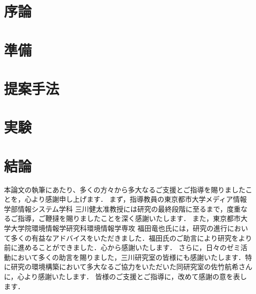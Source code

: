 \documentclass[12pt,uplatex]{jsarticle}   %
\begin{document}
\section{序論}


\section{準備}


\section{提案手法}


\section{実験}


\section{結論}



\acknowledgements
本論文の執筆にあたり、多くの方々から多大なるご支援とご指導を賜りましたことを，心より感謝申し上げます．
まず，指導教員の東京都市大学メディア情報学部情報システム学科 三川健太准教授には研究の最終段階に至るまで，度重なるご指導，ご鞭撻を賜りましたことを深く感謝いたします．
また，東京都市大学大学院環境情報学研究科環境情報学専攻 福田竜也氏には，研究の進行において多くの有益なアドバイスをいただきました．福田氏のご助言により研究をより前に進めることができました．心から感謝いたします．
さらに，日々のゼミ活動において多くの助言を賜りました，三川研究室の皆様にも感謝いたします．特に研究の環境構築において多大なるご協力をいただいた同研究室の佐竹航希さんに，心より感謝いたします．
皆様のご支援とご指導に，改めて感謝の意を表します．



\appendix

\end{document}

